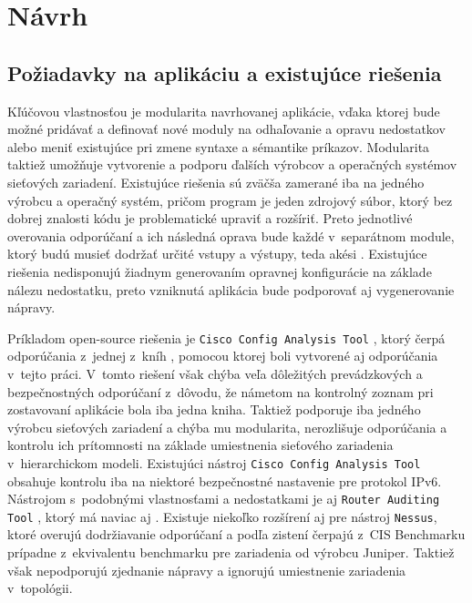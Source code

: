 \chapter{Návrh}

\section{Požiadavky na aplikáciu a existujúce riešenia}
Kľúčovou vlastnosťou je modularita navrhovanej aplikácie, vďaka ktorej bude možné pridávať a definovať nové moduly na odhaľovanie a opravu nedostatkov alebo meniť existujúce pri zmene syntaxe a sémantike príkazov. Modularita taktiež umožňuje vytvorenie a podporu ďalších výrobcov a operačných systémov sieťových zariadení. Existujúce riešenia sú zväčša zamerané iba na jedného výrobcu a operačný systém, pričom program je jeden zdrojový súbor, ktorý bez dobrej znalosti kódu je problematické upraviť a rozšíriť. Preto jednotlivé overovania odporúčaní a ich následná oprava bude každé v~separátnom module, ktorý budú musieť dodržať určité vstupy a výstupy, teda akési . Existujúce riešenia nedisponujú žiadnym generovaním opravnej konfigurácie na základe nálezu nedostatku, preto vzniknutá aplikácia bude podporovať aj vygenerovanie nápravy.

Príkladom open-source riešenia je \texttt{Cisco Config Analysis Tool} \cite{AU81CvNW4q8RGnqM}, ktorý čerpá odporúčania z~jednej z~kníh \cite{Singh2018}, pomocou ktorej boli vytvorené aj odporúčania v~tejto práci. V~tomto riešení však chýba veľa dôležitých prevádzkových a bezpečnostných odporúčaní z~dôvodu, že námetom na kontrolný zoznam pri zostavovaní aplikácie bola iba jedna kniha. Taktiež podporuje iba jedného výrobcu sieťových zariadení a chýba mu modularita, nerozlišuje odporúčania a kontrolu ich prítomnosti na základe umiestnenia sieťového zariadenia v~hierarchickom modeli. Existujúci nástroj \texttt{Cisco Config Analysis Tool} obsahuje kontrolu iba na niektoré bezpečnostné nastavenie pre protokol IPv6. Nástrojom s~podobnými vlastnosťami a nedostatkami je aj \texttt{Router Auditing Tool} \cite{OniomAfGpef53LHq}, ktorý má naviac aj . Existuje niekoľko rozšírení aj pre nástroj \texttt{Nessus}, ktoré overujú dodržiavanie odporúčaní a podľa zistení čerpajú z~CIS Benchmarku \cite{CIS_DrTLsgXv24lxeIIM} prípadne z~ekvivalentu benchmarku pre zariadenia od výrobcu Juniper. Taktiež však nepodporujú zjednanie nápravy a ignorujú umiestnenie zariadenia v~topológii.     

